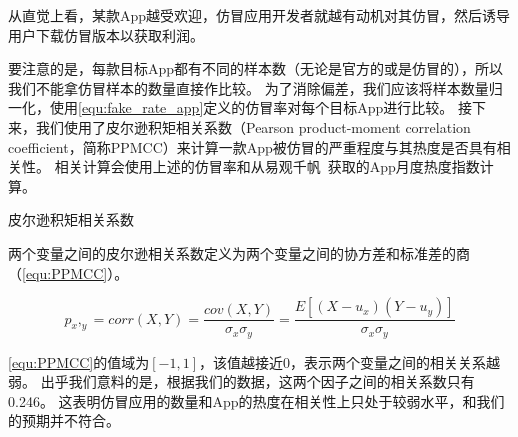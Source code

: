 从直觉上看，某款App越受欢迎，仿冒应用开发者就越有动机对其仿冒，然后诱导用户下载仿冒版本以获取利润。

要注意的是，每款目标App都有不同的样本数（无论是官方的或是仿冒的），所以我们不能拿仿冒样本的数量直接作比较。
为了消除偏差，我们应该将样本数量归一化，使用\autoref{equ:fake_rate_app}定义的仿冒率对每个目标App进行比较。
接下来，我们使用了皮尔逊积矩相关系数（Pearson product-moment correlation coefficient，简称PPMCC）来计算一款App被仿冒的严重程度与其热度是否具有相关性。
相关计算会使用上述的仿冒率和从易观千帆~\cite{yiguanqianfan}获取的App月度热度指数计算。

\begin{Def}
    皮尔逊积矩相关系数

    两个变量之间的皮尔逊相关系数定义为两个变量之间的协方差和标准差的商（\autoref{equ:PPMCC}）。
\end{Def}
\begin{equation}
    p_x,_y = corr(X,Y)=\frac{cov(X,Y)}{\sigma_x\sigma_y}=\frac{E[(X-u_x)(Y-u_y)]}{\sigma_x\sigma_y}
    \label{equ:PPMCC}
\end{equation}
\vspace{1mm}

\autoref{equ:PPMCC}的值域为$[-1, 1]$，该值越接近0，表示两个变量之间的相关关系越弱。
出乎我们意料的是，根据我们的数据，这两个因子之间的相关系数只有0.246。
这表明仿冒应用的数量和App的热度在相关性上只处于较弱水平，和我们的预期并不符合。

